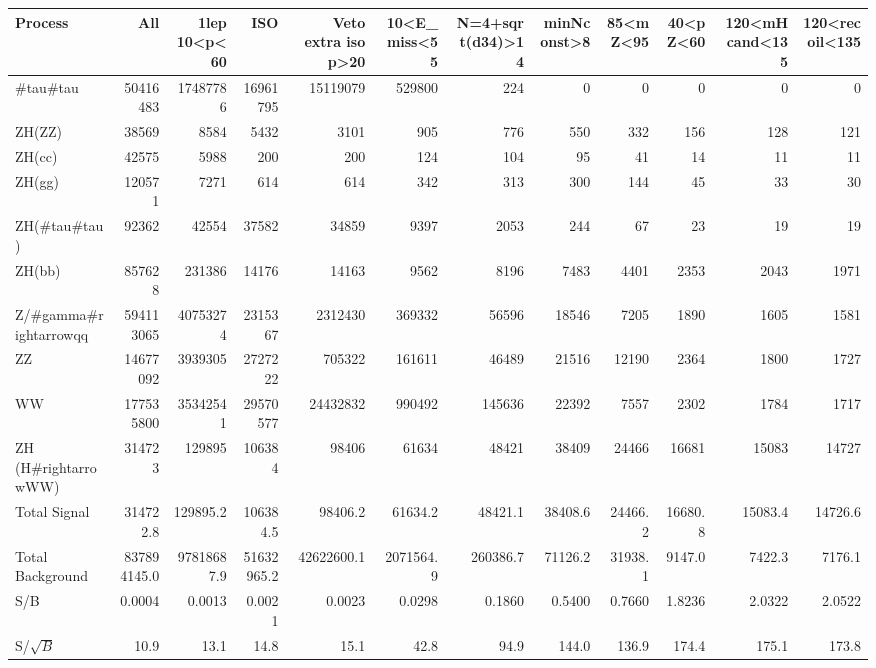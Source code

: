 \begin{tabular}{lrrrrrrrrrrr}
\hline
Process & All & 1lep 10<p<60 & ISO & Veto extra iso p>20 & 10<E_{miss}<55 & N=4+sqrt(d34)>14 & minNconst>8 & 85<mZ<95 & 40<pZ<60 & 120<mHcand<135 & 120<recoil<135 \\
\hline
#tau#tau & 50416483 & 17487786 & 16961795 & 15119079 & 529800 & 224 & 0 & 0 & 0 & 0 & 0 \\
ZH(ZZ) & 38569 & 8584 & 5432 & 3101 & 905 & 776 & 550 & 332 & 156 & 128 & 121 \\
ZH(cc) & 42575 & 5988 & 200 & 200 & 124 & 104 & 95 & 41 & 14 & 11 & 11 \\
ZH(gg) & 120571 & 7271 & 614 & 614 & 342 & 313 & 300 & 144 & 45 & 33 & 30 \\
ZH(#tau#tau) & 92362 & 42554 & 37582 & 34859 & 9397 & 2053 & 244 & 67 & 23 & 19 & 19 \\
ZH(bb) & 857628 & 231386 & 14176 & 14163 & 9562 & 8196 & 7483 & 4401 & 2353 & 2043 & 1971 \\
Z/#gamma#rightarrowqq & 594113065 & 40753274 & 2315367 & 2312430 & 369332 & 56596 & 18546 & 7205 & 1890 & 1605 & 1581 \\
ZZ & 14677092 & 3939305 & 2727222 & 705322 & 161611 & 46489 & 21516 & 12190 & 2364 & 1800 & 1727 \\
WW & 177535800 & 35342541 & 29570577 & 24432832 & 990492 & 145636 & 22392 & 7557 & 2302 & 1784 & 1717 \\
ZH (H#rightarrowWW) & 314723 & 129895 & 106384 & 98406 & 61634 & 48421 & 38409 & 24466 & 16681 & 15083 & 14727 \\
\hline
Total Signal & 314722.8 & 129895.2 & 106384.5 & 98406.2 & 61634.2 & 48421.1 & 38408.6 & 24466.2 & 16680.8 & 15083.4 & 14726.6 \\
Total Background & 837894145.0 & 97818687.9 & 51632965.2 & 42622600.1 & 2071564.9 & 260386.7 & 71126.2 & 31938.1 & 9147.0 & 7422.3 & 7176.1 \\
\hline
S/B & 0.0004 & 0.0013 & 0.0021 & 0.0023 & 0.0298 & 0.1860 & 0.5400 & 0.7660 & 1.8236 & 2.0322 & 2.0522 \\
S/$\sqrt{B}$ & 10.9 & 13.1 & 14.8 & 15.1 & 42.8 & 94.9 & 144.0 & 136.9 & 174.4 & 175.1 & 173.8 \\
\hline
\end{tabular}
